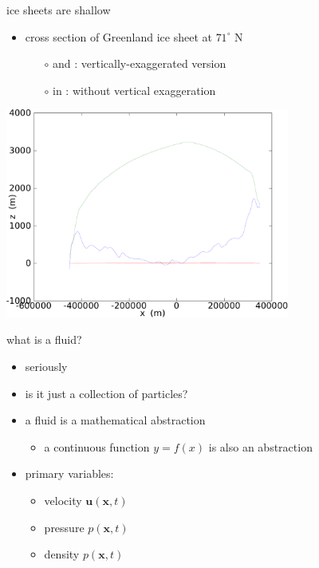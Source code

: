 \documentclass{beamer}
\newcommand{\bx}{\mathbf{x}}
\begin{document}
\begin{frame}{ice sheets are shallow}

\begin{itemize}
\item cross section of Greenland ice sheet at $71^\circ$ N
  \begin{itemize}
  \item[$\circ$] {\color{dark green}{green}} and {\color{dark blue}{blue}}: vertically-exaggerated version
  \item[$\circ$] in {\color{dark red}{red}}: without vertical exaggeration
  \end{itemize}
\end{itemize}
\normalsize

  \begin{center}
    \includegraphics[width=0.7\textwidth]{greentrans}
  \end{center}
\end{frame}


\begin{frame}{what is a fluid?}

\bigskip
\begin{itemize}
\item seriously
\item<2-> is it just a collection of particles?
\item<3-> a fluid is a mathematical abstraction
  \begin{itemize}
  \item<3->[$\circ$]   a continuous function $y=f(x)$ is also an abstraction
  \end{itemize}
\item<4-> primary variables:
  \begin{itemize}
  \item<4->[$\circ$]   velocity $\mathbf{u}(\bx,t)$
  \item<4->[$\circ$]   pressure $p(\bx,t)$
  \item<4->[$\circ$]   density $p(\bx,t)$
  \end{itemize}
\end{itemize}
\end{frame}
\end{document}
